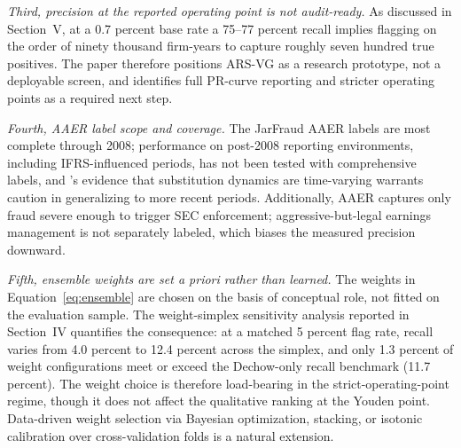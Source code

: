 \documentclass[12pt]{article}
\begin{document}
\emph{Third, precision at the reported operating point is not
audit-ready.}  As discussed in Section~V, at a 0.7 percent base
rate a 75--77 percent recall implies flagging on the order of ninety thousand
firm-years to capture roughly seven hundred true positives.  The paper
therefore positions ARS-VG as a research prototype, not a deployable
screen, and identifies full PR-curve reporting and stricter operating
points as a required next step.

\emph{Fourth, AAER label scope and coverage.}  The JarFraud AAER labels
are most complete through 2008; performance on post-2008 reporting
environments, including IFRS-influenced periods, has not been tested
with comprehensive labels, and \citet{pincus2022}'s evidence that
substitution dynamics are time-varying warrants caution in generalizing
to more recent periods.  Additionally, AAER captures only fraud severe
enough to trigger SEC enforcement; aggressive-but-legal earnings
management is not separately labeled, which biases the measured
precision downward.

\emph{Fifth, ensemble weights are set \textit{a priori} rather than
learned.}  The weights in Equation~\eqref{eq:ensemble} are chosen on
the basis of conceptual role, not fitted on the evaluation sample.
The weight-simplex sensitivity analysis reported in
Section~IV quantifies the consequence: at a matched
5 percent flag rate, recall varies from 4.0 percent to 12.4 percent across the
simplex, and only 1.3 percent of weight configurations meet or exceed the
Dechow-only recall benchmark (11.7 percent).  The weight choice is
therefore load-bearing in the strict-operating-point regime, though
it does not affect the qualitative ranking at the Youden point.
Data-driven weight selection via Bayesian optimization, stacking, or
isotonic calibration over cross-validation folds is a natural
extension.
\end{document}
